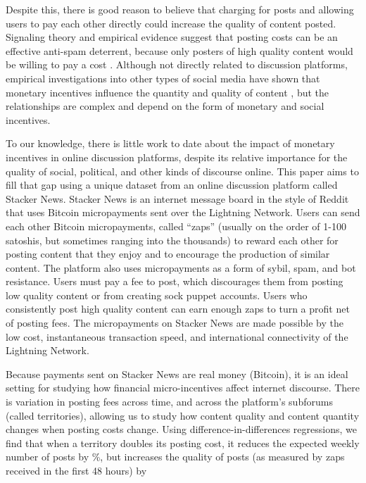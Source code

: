 Despite this, there is good reason to believe that charging for posts and allowing users to pay each other directly could increase the quality of content posted. Signaling theory and empirical evidence suggest that posting costs can be an effective anti-spam deterrent, because only posters of high quality content would be willing to pay a cost \citep{joseph2008email, tchernichovski2019pnas}. Although not directly related to discussion platforms, empirical investigations into other types of social media have shown that monetary incentives influence the quantity and quality of content \citep{chen2010google, sun2013blogs, burtch2017ms, elkomboz2023youtube, kerkhof2024youtube}, but the relationships are complex and depend on the form of monetary and social incentives.

To our knowledge, there is little work to date about the impact of monetary incentives in online discussion platforms, despite its relative importance for the quality of social, political, and other kinds of discourse online. This paper aims to fill that gap using a unique dataset from an online discussion platform called Stacker News. Stacker News is an internet message board in the style of Reddit that uses Bitcoin micropayments sent over the Lightning Network. Users can send each other Bitcoin micropayments, called ``zaps'' (usually on the order of 1-100 satoshis, but sometimes ranging into the thousands) to reward each other for posting content that they enjoy and to encourage the production of similar content. The platform also uses micropayments as a form of sybil, spam, and bot resistance. Users must pay a fee to post, which discourages them from posting low quality content or from creating sock puppet accounts. Users who consistently post high quality content can earn enough zaps to turn a profit net of posting fees. The micropayments on Stacker News are made possible by the low cost, instantaneous transaction speed, and international connectivity of the Lightning Network. 

Because payments sent on Stacker News are real money (Bitcoin), it is an ideal setting for studying how financial micro-incentives affect internet discourse. There is variation in posting fees across time, and across the platform's subforums (called territories), allowing us to study how content quality and content quantity changes when posting costs change. Using difference-in-differences regressions, we find that when a territory doubles its posting cost, it reduces the expected weekly number of posts by \%, but increases the quality of posts (as measured by zaps received in the first 48 hours) by  